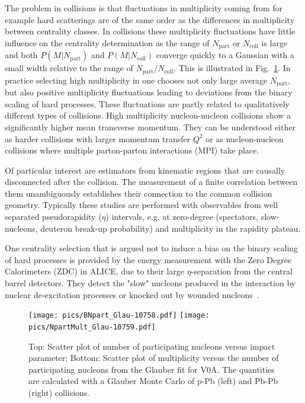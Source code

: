 The problem in \pPb collisions is that fluctuations in multiplicity coming from for example hard scatterings are of the same order as the differences in multiplicity between centrality classes. In \PbPb collisions these multiplicity fluctuations have little influence on the centrality determination as the range of $N_\mathrm{part}$ or $N_\mathrm{coll}$ is large and both $P\left(M|N_\mathrm{part}\right)$ and $P\left(M|N_\mathrm{coll}\right)$ converge quickly to a Gaussian with a small width relative to the range of $N_\mathrm{part}$/$N_\mathrm{coll}$. This is illustrated in Fig.~\ref{fig:pPbMult}. In practice selecting high multiplicity in \pPb one chooses not only large average $N_\mathrm{part}$, but also positive multiplicity fluctuations leading to deviations from the binary scaling of hard processes. These fluctuations are partly related to qualitatively different types of collisions. High multiplicity nucleon-nucleon collisions show a significantly higher mean transverse momentum. They can be understood either as harder collisions with larger momentum transfer $Q^2$ or as nucleon-nucleon collisions where multiple parton-parton interactions (MPI) take place. 

Of particular interest are estimators from kinematic regions that are causally disconnected after the collision. The measurement of a finite correlation between them unambiguously establishes their connection to the common collision geometry. Typically these studies are performed with observables from well separated pseudorapidity ($\eta$) intervals, e.g. at zero-degree (spectators, slow-nucleons, deuteron break-up probability) and multiplicity in the rapidity plateau.

One centrality selection that is argued not to induce a bias on the binary scaling of hard processes is provided by the energy measurement with the Zero Degree Calorimeters (ZDC) in ALICE, due to their large $\eta$-separation from the central barrel detectors. They detect the "slow" nucleons produced in the interaction by nuclear de-excitation processes or knocked out by wounded nucleons~\cite{Sikler:2003ef}.


\begin{figure}[htb]
\centering
            	\texttt{[image: pics/BNpart\_Glau-10758.pdf]}
            	\texttt{[image: pics/NpartMult\_Glau-10759.pdf]}
                \caption{Top: Scatter plot of number of participating nucleons versus impact parameter; Bottom: Scatter plot of multiplicity versus the number of participating nucleons from the Glauber fit for V0A. The quantities are calculated with a Glauber Monte Carlo of p-Pb (left) and Pb-Pb (right) collisions.~\cite{Adam:2014qja}}
	\label{fig:pPbMult}
\end{figure}


